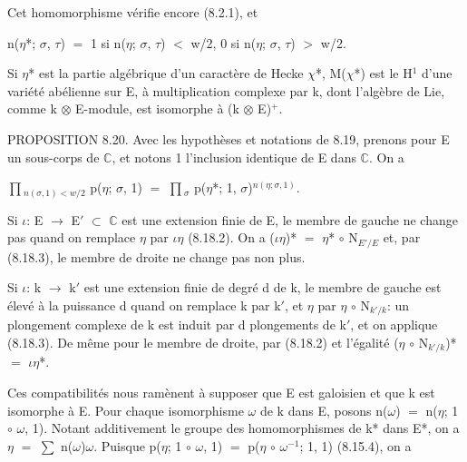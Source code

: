 \documentclass[10pt,twoside]{article}
\begin{document}
Cet homomorphisme vérifie encore (8.2.1), et\par
n(\ensuremath{η}*; \ensuremath{σ}, \ensuremath{τ}) \ensuremath{=} 1    si n(\ensuremath{η}; \ensuremath{σ}, \ensuremath{τ}) \ensuremath{<} w/2, 0    si n(\ensuremath{η}; \ensuremath{σ}, \ensuremath{τ}) \ensuremath{>} w/2.\par
Si \ensuremath{η}* est la partie algébrique d’un caractère de Hecke \ensuremath{χ}*, M(\ensuremath{χ}*) est le H\ensuremath{^{1}} d’une variété abélienne sur E, à multiplication complexe par k, dont l’algèbre de Lie, comme k \ensuremath{⊗} E-module, est isomorphe à (k \ensuremath{⊗} E)\ensuremath{^{+}}.\par
PROPOSITION 8.20. Avec les hypothèses et notations de 8.19, prenons pour E un sous-corps de \ensuremath{ℂ}, et notons 1 l’inclusion identique de E dans \ensuremath{ℂ}. On a\par
\ensuremath{∏}\ensuremath{_{n(σ,1)<w/2}} p(\ensuremath{η}; \ensuremath{σ}, 1) \ensuremath{=} \ensuremath{∏}\ensuremath{_{σ}} p(\ensuremath{η}*; 1, \ensuremath{σ})\ensuremath{^{n(η;σ,1)}}.\par
Si \ensuremath{ι}: E \ensuremath{→} E\ensuremath{′} \ensuremath{⊂} \ensuremath{ℂ} est une extension finie de E, le membre de gauche ne change pas quand on remplace \ensuremath{η} par \ensuremath{ι}\ensuremath{η} (8.18.2). On a (\ensuremath{ι}\ensuremath{η})* \ensuremath{=} \ensuremath{η}* \ensuremath{∘} N\ensuremath{_{E′/E}} et, par (8.18.3), le membre de droite ne change pas non plus.\par
Si \ensuremath{ι}: k \ensuremath{→} k\ensuremath{′} est une extension finie de degré d de k, le membre de gauche est élevé à la puissance d quand on remplace k par k\ensuremath{′}, et \ensuremath{η} par \ensuremath{η} \ensuremath{∘} N\ensuremath{_{k′/k}}: un plongement complexe de k est induit par d plongements de k\ensuremath{′}, et on applique (8.18.3). De même pour le membre de droite, par (8.18.2) et l’égalité (\ensuremath{η} \ensuremath{∘} N\ensuremath{_{k′/k}})* \ensuremath{=} \ensuremath{ι}\ensuremath{η}*.\par
Ces compatibilités nous ramènent à supposer que E est galoisien et que k est isomorphe à E. Pour chaque isomorphisme \ensuremath{ω} de k dans E, posons n(\ensuremath{ω}) \ensuremath{=} n(\ensuremath{η}; 1 \ensuremath{∘} \ensuremath{ω}, 1). Notant additivement le groupe des homomorphismes de k* dans E*, on a \ensuremath{η} \ensuremath{=} \ensuremath{∑} n(\ensuremath{ω})\ensuremath{ω}. Puisque p(\ensuremath{η}; 1 \ensuremath{∘} \ensuremath{ω}, 1) \ensuremath{=} p(\ensuremath{η} \ensuremath{∘} \ensuremath{ω}\ensuremath{^{-1}}; 1, 1) (8.15.4), on a\par
\end{document}
